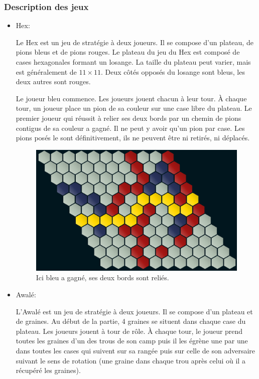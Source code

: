 \subsubsection{Description des jeux}
\begin{itemize}
    \item Hex:
    
    Le Hex est un jeu de stratégie à deux joueurs. Il se compose d'un plateau, de pions bleus
    et de pions rouges. Le plateau du jeu du Hex est composé de cases hexagonales formant un losange. La taille
    du plateau peut varier, mais est généralement de $11\times 11$. Deux côtés opposés du losange sont bleus, les deux 
    autres sont rouges. 

    Le joueur bleu commence. Les joueurs jouent chacun à leur tour. À chaque tour, un joueur place un pion de sa couleur sur une 
    case libre du plateau. Le premier joueur qui réussit à relier ses deux bords par un chemin de pions contigus de sa couleur
    a gagné. Il ne peut y avoir qu'un pion par case. Les pions posés le sont définitivement, ils ne peuvent être ni retirés, ni
    déplacés.\\

    \begin{figure}[!htb]
        \begin{center}
            \includegraphics[scale=0.5]{root/hex_jeu_bleu}
        \end{center}
        \caption{Ici bleu a gagné, ses deux bords sont reliés.}\label{fig:hex_jeu_bleu}
    \end{figure}
    

    \item Awalé:
    
    L'Awalé est un jeu de stratégie à deux joueurs. Il se compose d'un plateau et de graines. Au début de la partie, 4 graines se 
    situent dans chaque case du plateau. Les joueurs jouent à tour de rôle. À chaque tour, le joueur prend toutes les graines d'un 
    des trous de son camp puis il les égrène une par une dans toutes les cases qui suivent sur sa rangée puis sur celle de son adversaire 
    suivant le sens de rotation (une graine dans chaque trou après celui où il a récupéré les graines).


\end{itemize}
